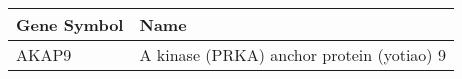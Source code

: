 \begin{tabular}{ll}
\toprule
Gene Symbol &                                      Name \\
\midrule
      AKAP9 & A kinase (PRKA) anchor protein (yotiao) 9 \\
\bottomrule
\end{tabular}
